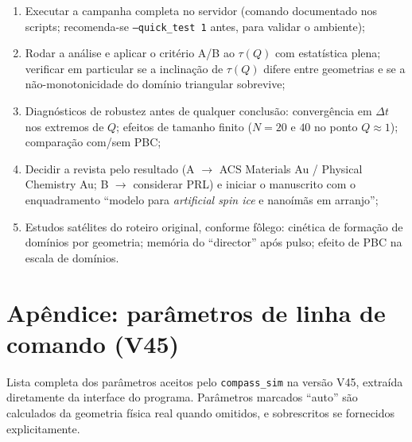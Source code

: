\documentclass[11pt,a4paper]{article}
\newcommand{\code}[1]{\texttt{#1}}
\begin{document}
\begin{enumerate}
\item Executar a campanha completa no servidor (comando documentado nos
scripts; recomenda-se \code{--quick\_test 1} antes, para validar o
ambiente);
\item Rodar a análise e aplicar o critério A/B ao $\tau(Q)$ com
estatística plena; verificar em particular se a inclinação de $\tau(Q)$
difere entre geometrias e se a não-monotonicidade do domínio triangular
sobrevive;
\item Diagnósticos de robustez antes de qualquer conclusão: convergência
em $\Delta t$ nos extremos de $Q$; efeitos de tamanho finito ($N = 20$ e
$40$ no ponto $Q \approx 1$); comparação com/sem PBC;
\item Decidir a revista pelo resultado (A $\to$ ACS Materials Au /
Physical Chemistry Au; B $\to$ considerar PRL) e iniciar o manuscrito
com o enquadramento ``modelo para \emph{artificial spin ice} e nanoímãs
em arranjo'';
\item Estudos satélites do roteiro original, conforme fôlego: cinética
de formação de domínios por geometria; memória do ``director'' após
pulso; efeito de PBC na escala de domínios.
\end{enumerate}

\appendix
\section{Apêndice: parâmetros de linha de comando (V45)}

Lista completa dos parâmetros aceitos pelo \code{compass\_sim} na versão
V45, extraída diretamente da interface do programa. Parâmetros marcados
``auto'' são calculados da geometria física real quando omitidos, e
sobrescritos se fornecidos explicitamente.

\begingroup
\small
\setlength{\tabcolsep}{5pt}
\renewcommand{\arraystretch}{1.15}
\end{document}
